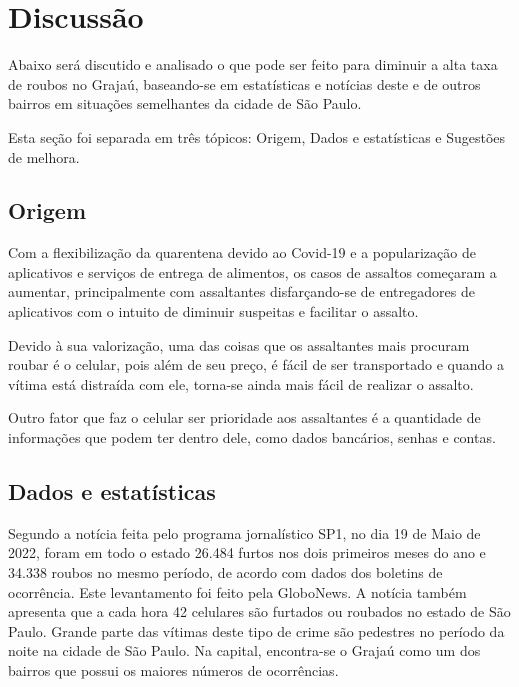\section{Discussão}

    Abaixo será discutido e analisado o que pode ser feito para diminuir a alta taxa de
    roubos no Grajaú, baseando-se em estatísticas e notícias deste e de outros bairros em 
    situações semelhantes da cidade de São Paulo.

    Esta seção foi separada em três tópicos: Origem, Dados e estatísticas e Sugestões de melhora.

    \subsection{Origem}

        Com a flexibilização da quarentena devido ao Covid-19 e a popularização de aplicativos
        e serviços de entrega de alimentos, os casos de assaltos começaram a aumentar,
        principalmente com assaltantes disfarçando-se de entregadores de aplicativos com o
        intuito de diminuir suspeitas e facilitar o assalto.
        
        Devido à sua valorização, uma das coisas que os assaltantes mais procuram roubar é o
        celular, pois além de seu preço, é fácil de ser transportado e quando a vítima está
        distraída com ele, torna-se ainda mais fácil de realizar o assalto.
        
        Outro fator que faz o celular ser prioridade aos assaltantes é a quantidade de informações
        que podem ter dentro dele, como dados bancários, senhas e contas.

    \subsection{Dados e estatísticas}

        Segundo a notícia feita pelo programa jornalístico SP1, no dia 19 de Maio de 2022,
        foram em todo o estado 26.484 furtos nos dois primeiros meses do ano e 34.338 roubos
        no mesmo período, de acordo com dados dos boletins de ocorrência. Este levantamento
        foi feito pela GloboNews. A notícia também apresenta que a cada hora 42 celulares
        são furtados ou roubados no estado de São Paulo. Grande parte das vítimas deste tipo
        de crime são pedestres no período da noite na cidade de São Paulo. Na capital,
        encontra-se o Grajaú como um dos bairros que possui os maiores números de ocorrências.

